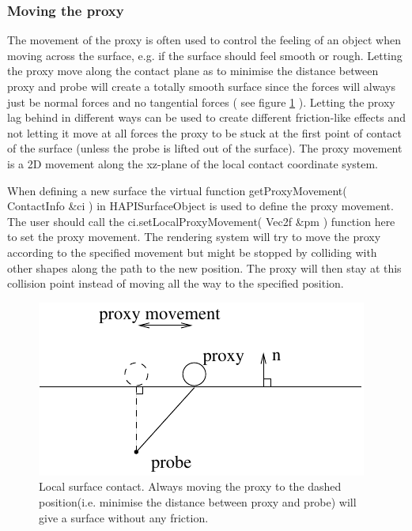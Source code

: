 \subsubsection{Moving the proxy}
The movement of the proxy is often used to control the feeling of an object when moving across the surface, e.g. if the surface should feel smooth or rough. Letting the proxy move along the contact plane as to minimise the distance between proxy and probe will create a totally smooth surface since the forces will always just be normal forces and no tangential forces ( see figure \ref{proxy movement} ). Letting the proxy lag behind in different ways can be used to create different friction-like effects and not letting it move at all forces the proxy to be stuck at the first point of contact of the surface (unless the probe is lifted out of the surface). The proxy movement is a 2D movement along the xz-plane of the local contact coordinate system. 

When defining a new surface the virtual function getProxyMovement( ContactInfo \&ci ) in HAPISurfaceObject is used to define the proxy movement. The user should call the ci.setLocalProxyMovement( Vec2f \&pm ) function here to set the proxy movement. The rendering system will try to move the proxy according to the specified movement but might be stopped by colliding with other shapes along the path to the new position. The proxy will then stay at this collision point instead of moving all the way to the specified position.

\begin{figure} 
  \centering 
  \includegraphics{images/surface.pdf}
  \caption{Local surface contact. Always moving the proxy to the dashed position(i.e. minimise the distance between proxy and probe) will give a surface without any friction.}
  \label{proxy movement} 
\end{figure}

